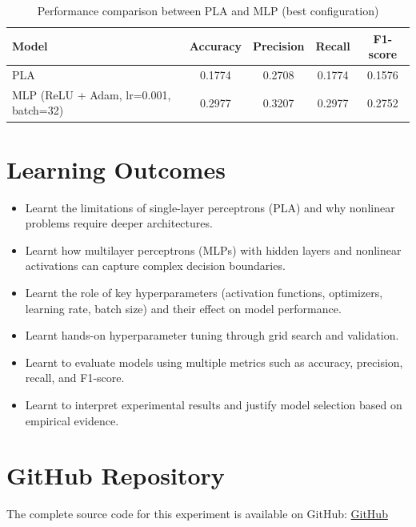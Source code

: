 \documentclass[11pt]{article}
\begin{document}
\vspace{1cm}
\begin{table}[H]
\centering
\caption{Performance comparison between PLA and MLP (best configuration)}
\begin{tabular}{|l|c|c|c|c|}
\hline
\textbf{Model} & \textbf{Accuracy} & \textbf{Precision} & \textbf{Recall} & \textbf{F1-score} \\ \hline
PLA  & 0.1774 & 0.2708 & 0.1774 & 0.1576 \\ \hline
MLP (ReLU + Adam, lr=0.001, batch=32) & 0.2977 & 0.3207 & 0.2977 & 0.2752 \\ \hline
\end{tabular}
\end{table}

\vspace{1cm}
\section{Learning Outcomes}
\begin{itemize}
    \item Learnt the limitations of single-layer perceptrons (PLA) and why nonlinear problems require deeper architectures.  
    \item Learnt how multilayer perceptrons (MLPs) with hidden layers and nonlinear activations can capture complex decision boundaries.  
    \item Learnt the role of key hyperparameters (activation functions, optimizers, learning rate, batch size) and their effect on model performance.  
    \item Learnt hands-on hyperparameter tuning through grid search and validation.  
    \item Learnt to evaluate models using multiple metrics such as accuracy, precision, recall, and F1-score.  
    \item Learnt to interpret experimental results and justify model selection based on empirical evidence.  
\end{itemize}

\vspace{1cm}
\section*{GitHub Repository}
The complete source code for this experiment is available on GitHub:
\href{https://github.com/R-Jayasree/Machine-Learning/tree/main/Assignment5}{GitHub}
\end{document}
